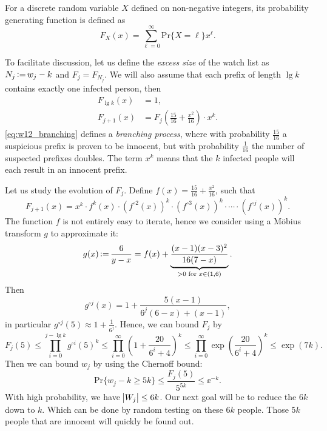 \begin{definition}
    For a discrete random variable $X$ defined on non-negative integers, its probability generating function is defined as
    \begin{equation}
        F_X(x) = \sum_{\ell=0}^{\infty} \mathrm{Pr}\{X=\ell\} x^\ell.
    \end{equation}
\end{definition}
To facilitate discussion, let us define the \textit{excess size} of the watch list as $N_j \operatorname{\vcentcolon=} w_j-k$ and $F_j = F_{N_j}$. We will also assume that each prefix of length $\lg k$ contains exactly one infected person, then
\begin{align}
    F_{\lg k}(x) &= 1, \\
    F_{j+1}(x) &= F_{j}\left(\frac{15}{16} + \frac{x^2}{16}\right) \cdot x^k. \label{eq:w12_branching}
\end{align}
\autoref{eq:w12_branching} defines a \textit{branching process}, where with probability $\frac{15}{16}$ a suspicious prefix is proven to be innocent, but with probability $\frac{1}{16}$ the number of suspected prefixes doubles. The term $x^k$ means that the $k$ infected people will each result in an innocent prefix.

Let us study the evolution of $F_j$. Define $f(x) = \frac{15}{16} + \frac{x^2}{16}$, such that
\begin{equation}
    F_{j+1}(x) = x^k \cdot f^k(x) \cdot \left(f^{\circ2}(x)\right)^k \cdot \left(f^{\circ3}(x)\right)^k \cdot \cdots \cdot \left(f^{\circ j}(x)\right)^k.
\end{equation}
The function $f$ is not entirely easy to iterate, hence we consider using a M\"obius transform $g$ to approximate it:
\begin{equation}
    g(x) \operatorname{\vcentcolon=} \frac{6}{y-x} = f(x) + \underbrace{\frac{(x-1)(x-3)^2}{16(7-x)}}_{>0 \text{ for }x\in(1,6)}.
\end{equation}
Then
\begin{equation}
    g^{\circ j}(x) = 1 + \frac{5(x-1)}{6^j(6-x) + (x-1)},
\end{equation}
in particular $g^{\circ j}(5) \approx 1 + \frac{1}{6^j}$. Hence, we can bound $F_j$ by
\begin{equation*}
    F_j(5) \le \prod_{i=0}^{j-\lg k} g^{\circ i}(5)^k \le \prod_{i=0}^{\infty} \left(1 + \frac{20}{6^i+4}\right)^k \le \prod_{i=0}^{\infty}\exp\left(\frac{20}{6^i+4}\right)^k \le \exp(7k).
\end{equation*}
Then we can bound $w_j$ by using the Chernoff bound:
\begin{equation*}
    \mathrm{Pr}\{w_j-k \ge 5k\} \le \frac{F_j(5)}{5^{5k}} \le \ee^{-k}.
\end{equation*}
With high probability, we have $\abs{W_j}\le 6k$. Our next goal will be to reduce the $6k$ down to $k$. Which can be done by random testing on these $6k$ people. Those $5k$ people that are innocent will quickly be found out.


